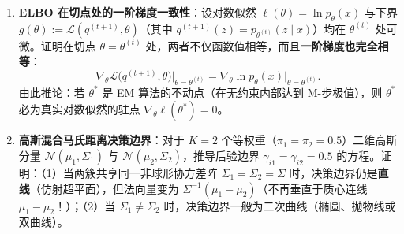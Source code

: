 
\begin{enumerate}[label=\textbf{6.\arabic*}, resume]
  \item \textbf{ELBO 在切点处的一阶梯度一致性}：设对数似然 $\ell(\theta) = \ln p_\theta(x)$ 与下界 $g(\theta) := \mathcal{L}(q^{(t+1)}, \theta)$（其中 $q^{(t+1)}(z) = p_{\theta^{(t)}}(z \mid x)$）均在 $\theta^{(t)}$ 处可微。证明在切点 $\theta = \theta^{(t)}$ 处，两者不仅函数值相等，而且\textbf{一阶梯度也完全相等}：
  \[
    \nabla_\theta \mathcal{L}\big(q^{(t+1)}, \theta\big)\Big|_{\theta = \theta^{(t)}} = \nabla_\theta \ln p_\theta(x)\Big|_{\theta = \theta^{(t)}}.
  \]
  由此推论：若 $\theta^*$ 是 EM 算法的不动点（在无约束内部达到 M-步极值），则 $\theta^*$ 必为真实对数似然的驻点 $\nabla_\theta \ell(\theta^*) = 0$。

  \item \textbf{高斯混合马氏距离决策边界}：对于 $K = 2$ 个等权重（$\pi_1 = \pi_2 = 0.5$）二维高斯分量 $\mathcal{N}(\mu_1, \Sigma_1)$ 与 $\mathcal{N}(\mu_2, \Sigma_2)$，推导后验边界 $\gamma_{i1} = \gamma_{i2} = 0.5$ 的方程。证明：（1）当两簇共享同一非球形协方差阵 $\Sigma_1 = \Sigma_2 = \Sigma$ 时，决策边界仍是\textbf{直线}（仿射超平面），但法向量变为 $\Sigma^{-1}(\mu_1 - \mu_2)$（不再垂直于质心连线 $\mu_1 - \mu_2$！）；（2）当 $\Sigma_1 \neq \Sigma_2$ 时，决策边界一般为二次曲线（椭圆、抛物线或双曲线）。
\end{enumerate}


